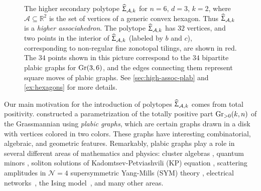 \documentclass[11pt]{amsart}
\theoremstyle{plain}
\theoremstyle{definition}
\def\R{\mathbb{R}}
\def\A{\mathcal{A}}
\def\HSP{\widehat\Upsigma}
\def\Sigma{\HSP}
\let\subset\subseteq
\begin{document}
\begin{figure}
{\begin{tikzpicture}
\end{tikzpicture}
}
  \caption{ \label{fig:Gr_3_6} The higher secondary polytope $\Sigma_{\A,k}$ for $n=6$, $d=3$, $k=2$, where $\A\subset \R^2$ is the set of vertices of a generic convex hexagon. Thus $\Sigma_{\A,k}$ is a \emph{higher associahedron}. The polytope  $\Sigma_{\A,k}$ has $32$ vertices, and two points in the interior of $\Sigma_{\A,k}$ (labeled by $b$ and $c$), corresponding to non-regular fine zonotopal tilings, are shown in red. The $34$ points shown in this picture correspond to the $34$ bipartite plabic graphs for $\operatorname{Gr}(3,6)$, and the edges connecting them represent square moves of plabic graphs. See \cref{sec:high-assoc-plab} and \cref{ex:hexagons} for more details.}
\end{figure}


Our main motivation for the introduction of polytopes $\Sigma_{\A, k}$ comes from
total positivity.  \cite{Pos06} constructed a parametrization of 
the totally positive part $\operatorname{Gr}_{>0}(k,n)$ of the Grassmannian using 
\emph{plabic graphs}, which are certain graphs drawn in a disk with vertices 
colored in two colors.  These graphs have interesting combinatorial, algebraic,
and geometric features.
Remarkably, plabic graphs play a role in several different areas of mathematics
and physics: cluster algebras \cite{Scott}, quantum minors \cite{Scott2}, soliton solutions
of  Kadomtsev-Petviashvili (KP) equation \cite{KW, KW2}, scattering amplitudes 
in $\mathcal{N}=4$ supersymmetric Yang-Mills (SYM) theory \cite{abcgpt},
electrical networks~\cite{Lam}, the Ising model~\cite{Ising}, and many other areas.
\end{document}
